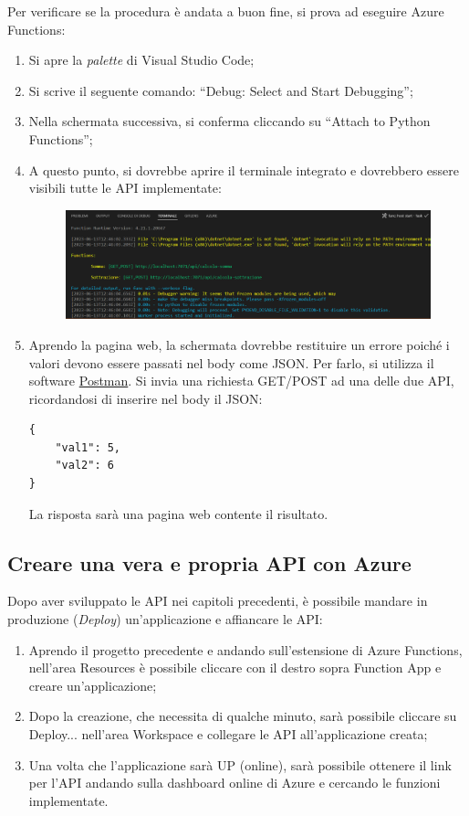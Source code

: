\documentclass[a4paper]{article}
\newcommand{\dquotes}[1]{``#1''}
\begin{document}
	Per verificare se la procedura è andata a buon fine, si prova ad eseguire Azure Functions:
	\begin{enumerate}
		\item Si apre la \emph{palette} di Visual Studio Code;
		
		\item Si scrive il seguente comando: \dquotes{\textsf{Debug: Select and Start Debugging}};
		
		\item Nella schermata successiva, si conferma cliccando su \dquotes{\textsf{Attach to Python Functions}};
		
		\item A questo punto, si dovrebbe aprire il terminale integrato e dovrebbero essere visibili tutte le API implementate:
		\begin{figure}[!htp]
			\centering
			\includegraphics[width=\textwidth]{img/azure-4.png}
		\end{figure}
		
		\item Aprendo la pagina web, la schermata dovrebbe restituire un errore poiché i valori devono essere passati nel body come JSON. Per farlo, si utilizza il software \href{https://www.postman.com/}{Postman}. Si invia una richiesta GET/POST ad una delle due API, ricordandosi di inserire nel body il JSON:
		\begin{lstlisting}
{
	"val1": 5,
	"val2": 6
}\end{lstlisting}
		La risposta sarà una pagina web contente il risultato.
	\end{enumerate}\newpage
	
	\subsection{Creare una vera e propria API con Azure}
	
	Dopo aver sviluppato le API nei capitoli precedenti, è possibile mandare in produzione (\emph{Deploy}) un'applicazione e affiancare le API:
	\begin{enumerate}
		\item Aprendo il progetto precedente e andando sull'estensione di Azure Functions, nell'area Resources è possibile cliccare con il destro sopra Function App e creare un'applicazione;
		
		\item Dopo la creazione, che necessita di qualche minuto, sarà possibile cliccare su \textsf{Deploy...} nell'area Workspace e collegare le API all'applicazione creata;
		
		\item Una volta che l'applicazione sarà UP (online), sarà possibile ottenere il link per l'API andando sulla dashboard online di Azure e cercando le funzioni implementate.
	\end{enumerate}
\end{document}
